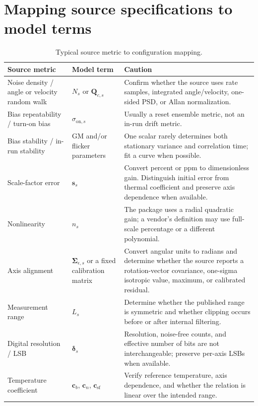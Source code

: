 \documentclass[11pt,oneside,headings=big]{scrreprt}
\newcommand{\vect}[1]{\bm{#1}}
\newcommand{\mat}[1]{\bm{#1}}
\begin{document}
    \section{Mapping source specifications to model terms}
    \begin{table}[htbp]
        \centering
        \caption{Typical source metric to configuration mapping.}
        \label{tab:profile-mapping}
        \begin{tabularx}{\textwidth}{@{}L{1.8in}L{1.8in}Y@{}}
\toprule
\textbf{Source metric} & \textbf{Model term} & \textbf{Caution} \\
\midrule
Noise density / angle or velocity random walk & $N_s$ or $\mat Q_{c,s}$ & Confirm whether the source uses rate samples, integrated angle/velocity, one-sided PSD, or Allan normalization. \\
Bias repeatability / turn-on bias & $\sigma_{\mathrm{on},s}$ & Usually a reset ensemble metric, not an in-run drift metric. \\
Bias stability / in-run stability & GM and/or flicker parameters & One scalar rarely determines both stationary variance and correlation time; fit a curve when possible. \\
Scale-factor error & $\vect s_s$ & Convert percent or ppm to dimensionless gain. Distinguish initial error from thermal coefficient and preserve axis dependence when available. \\
Nonlinearity & $n_s$ & The package uses a radial quadratic gain; a vendor's definition may use full-scale percentage or a different polynomial. \\
Axis alignment & $\mat\Sigma_{\epsilon,s}$ or a fixed calibration matrix & Convert angular units to radians and determine whether the source reports a rotation-vector covariance, one-sigma isotropic value, maximum, or calibrated residual. \\
Measurement range & $L_s$ & Determine whether the published range is symmetric and whether clipping occurs before or after internal filtering. \\
Digital resolution / LSB & $\vect\delta_s$ & Resolution, noise-free counts, and effective number of bits are not interchangeable; preserve per-axis LSBs when available. \\
Temperature coefficient & $\vect c_b$, $\vect c_n$, $\vect c_{\mathrm{sf}}$ & Verify reference temperature, axis dependence, and whether the relation is linear over the intended range. \\
\bottomrule
        \end{tabularx}
    \end{table}
\end{document}
